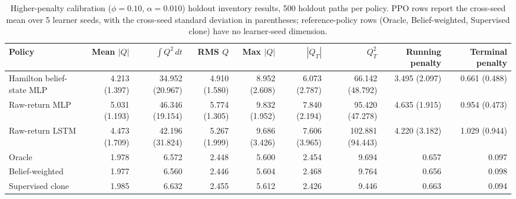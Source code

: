 \begin{table}[ht]
\centering
\small
\begin{tabular}{lrrrrrrrr}
\toprule
Policy & Mean $|Q|$ & $\int Q^2\,dt$ & RMS $Q$ & Max $|Q|$ & $|Q_T|$ & $Q_T^2$ & Running penalty & Terminal penalty \\
\midrule
Hamilton belief-state MLP & 4.213 (1.397) & 34.952 (20.967) & 4.910 (1.580) & 8.952 (2.608) & 6.073 (2.787) & 66.142 (48.792) & 3.495 (2.097) & 0.661 (0.488) \\
Raw-return MLP & 5.031 (1.193) & 46.346 (19.154) & 5.774 (1.305) & 9.832 (1.952) & 7.840 (2.194) & 95.420 (47.278) & 4.635 (1.915) & 0.954 (0.473) \\
Raw-return LSTM & 4.473 (1.709) & 42.196 (31.824) & 5.267 (1.999) & 9.686 (3.426) & 7.606 (3.965) & 102.881 (94.443) & 4.220 (3.182) & 1.029 (0.944) \\
Oracle & 1.978 & 6.572 & 2.448 & 5.600 & 2.454 & 9.694 & 0.657 & 0.097 \\
Belief-weighted & 1.977 & 6.560 & 2.446 & 5.604 & 2.468 & 9.764 & 0.656 & 0.098 \\
Supervised clone & 1.985 & 6.632 & 2.455 & 5.612 & 2.426 & 9.446 & 0.663 & 0.094 \\
\bottomrule
\end{tabular}
\caption{Higher-penalty calibration ($\phi=0.10$, $\alpha=0.010$) holdout inventory results, 500 holdout paths per policy. PPO rows report the cross-seed mean over 5 learner seeds, with the cross-seed standard deviation in parentheses; reference-policy rows (Oracle, Belief-weighted, Supervised clone) have no learner-seed dimension.}
\label{tab:ips-high-penalty-inventory}
\end{table}

